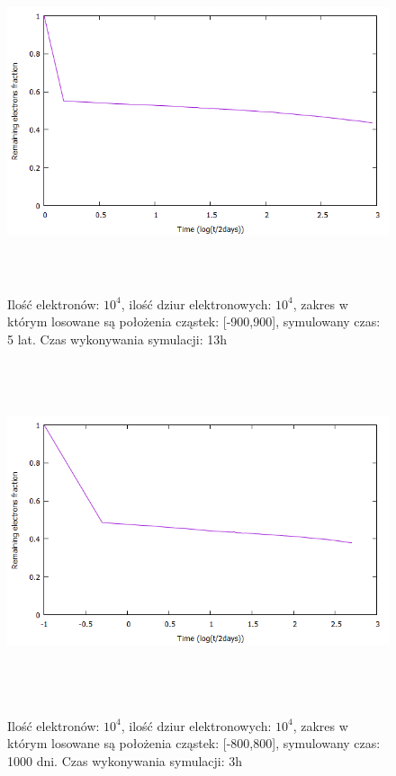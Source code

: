 \begin{figure}[H]
\centering
\includegraphics[width=17cm, height = 10cm]{wykres2}
\caption{Ilość elektronów: $10^{4}$, ilość dziur elektronowych: $10^{4}$, zakres w którym losowane są położenia cząstek: [-900,900], symulowany czas: 5 lat. Czas wykonywania symulacji: 13h}
\end{figure}
 
\begin{figure}[H]
\centering
\includegraphics[width=17cm, height = 10cm]{wykres1}
\label{rys:1}
\caption{Ilość elektronów: $10^{4}$, ilość dziur elektronowych: $10^{4}$, zakres w którym losowane są położenia cząstek: [-800,800], symulowany czas: 1000 dni. Czas wykonywania symulacji: 3h}
\end{figure}

